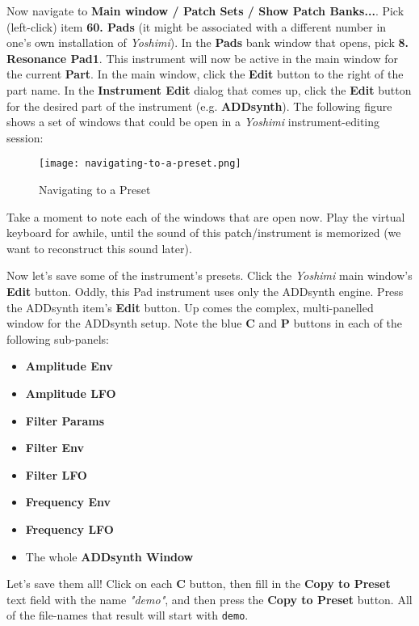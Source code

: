    Now navigate to
   \textbf{Main window / Patch Sets / Show Patch Banks...}.
   Pick (left-click) item \textbf{60. Pads} (it might be associated with a
   different number in one's own installation of \textsl{Yoshimi}).
   In the \textbf{Pads} bank window that opens, pick \textbf{8. Resonance Pad1}.
   This instrument will now be active in the main window for the current
   \textbf{Part}.
   In the main window, click the \textbf{Edit} button to the right of the part
   name.  In the
   \textbf{Instrument Edit} dialog that comes up, click the \textbf{Edit}
   button for the desired part of the instrument (e.g. \textbf{ADDsynth}).
   The following figure shows a set of windows that could be open in a
   \textsl{Yoshimi} instrument-editing session:

\begin{figure}[H]
   \centering 
   \texttt{[image: navigating-to-a-preset.png]}
   \caption{Navigating to a Preset}
   \label{fig:presets_navigating_to_a_preset}
\end{figure}

   Take a moment to note each of the windows that are open now.
   Play the virtual keyboard for awhile, until the sound of this
   patch/instrument is memorized (we want to reconstruct this sound later).

   Now let's save some of the instrument's presets.
   Click the \textsl{Yoshimi} main window's \textbf{Edit} button.
   Oddly, this Pad instrument uses only the ADDsynth engine.
   Press the ADDsynth item's \textbf{Edit} button.
   Up comes the complex, multi-panelled window for the ADDsynth setup.
   Note the blue \textbf{C} and \textbf{P} buttons in each of the following
   sub-panels:

   \begin{itemize}
      \item \textbf{Amplitude Env}
      \item \textbf{Amplitude LFO}
      \item \textbf{Filter Params}
      \item \textbf{Filter Env}
      \item \textbf{Filter LFO}
      \item \textbf{Frequency Env}
      \item \textbf{Frequency LFO}
      \item The whole \textbf{ADDsynth Window}
   \end{itemize}

   Let's save them all!  Click on each \textbf{C} button,
   then fill in the \textbf{Copy to Preset} text field with
   the name \textsl{"demo"}, and then press the \textbf{Copy to Preset}
   button.  All of the file-names that result will start with
   \texttt{demo}.

